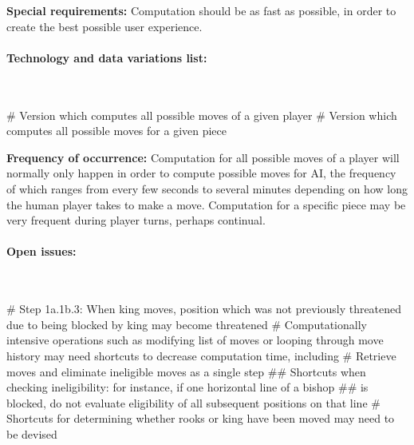 \documentclass{article}
\begin{document}
\textbf{Special requirements:} Computation should be as fast as possible, in order to create the best possible user experience. \\

\paragraph{Technology and data variations list:}\mbox{}\\
\begin{easylist}[itemize]
# Version which computes all possible moves of a given player
# Version which computes all possible moves for a given piece
\end{easylist}

\textbf{Frequency of occurrence:} Computation for all possible moves of a player will normally only happen in order to compute possible moves for AI, the frequency of which ranges from every few seconds to several minutes depending on how long the human player takes to make a move. Computation for a specific piece may be very frequent during player turns, perhaps continual. \\

\paragraph{Open issues:}\mbox{}\\
\begin{easylist}[itemize]
# Step 1a.1b.3: When king moves, position which was not previously threatened due to being blocked by king may become threatened
# Computationally intensive operations such as modifying list of moves or looping through move history may need shortcuts to decrease computation time, including
# Retrieve moves and eliminate ineligible moves as a single step
## Shortcuts when checking ineligibility: for instance, if one horizontal line of a bishop
## is blocked, do not evaluate eligibility of all subsequent positions on that line
# Shortcuts for determining whether rooks or king have been moved may need to be devised
\end{easylist}
\end{document}
